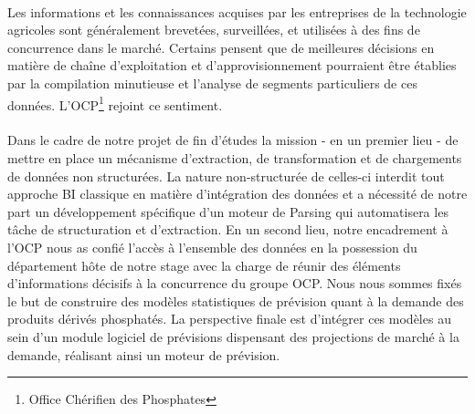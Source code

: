 \paragraph{}
Les informations et les connaissances acquises par les entreprises de la technologie agricoles sont généralement brevetées, surveillées, et utilisées à des fins de concurrence dans le marché. Certains pensent que de meilleures décisions en matière de chaîne d'exploitation et d'approvisionnement pourraient être établies par la compilation minutieuse et l'analyse de segments particuliers de ces données. L'OCP\footnote{Office Chérifien des Phosphates} rejoint ce sentiment.
\paragraph{}
 Dans le cadre de notre projet de fin d'études la mission - en un premier lieu - de mettre en place un mécanisme d'extraction, de transformation et de chargements de données non structurées. La nature non-structurée de celles-ci interdit tout approche BI classique en matière d'intégration des données et a nécessité de notre part un développement spécifique d'un moteur de Parsing qui automatisera les tâche de structuration et d'extraction. En un second lieu, notre encadrement à l'OCP nous as confié l'accès à l'ensemble des données en la possession du département hôte de notre stage avec la charge de réunir des éléments d'informations décisifs à la concurrence du groupe OCP. Nous nous sommes fixés le but de construire des modèles statistiques de prévision quant à la demande des produits dérivés phosphatés. La perspective finale est d'intégrer ces modèles au sein d'un module logiciel de prévisions dispensant des projections de marché à la demande, réalisant ainsi un moteur de prévision.
